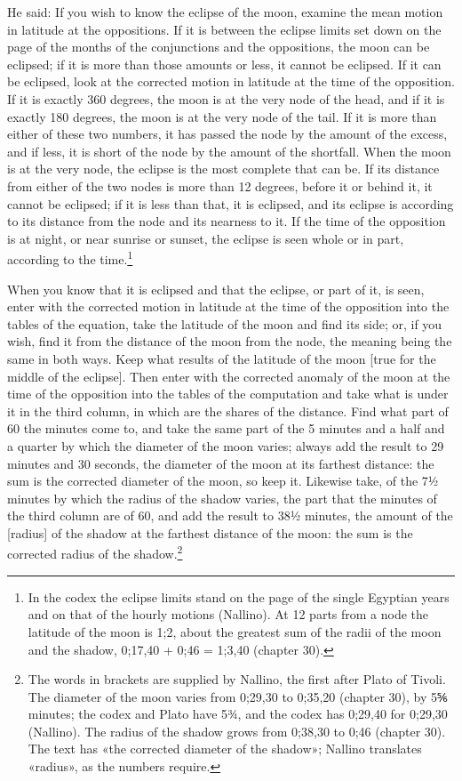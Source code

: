 \documentclass[11pt]{article}
\newcommand{\ArPage}[1]{\marginpar{\footnotesize\color{gray}Ar.\,p.\,#1}}
\begin{document}
\par He said: If you wish to know the eclipse of the moon, examine the mean motion in latitude at the oppositions. If it is between the eclipse limits set down on the page of the months of the conjunctions and the oppositions, the moon can be eclipsed; if it is more than those amounts or less, it cannot be eclipsed. If it can be eclipsed, look at the corrected motion in latitude at the time of the opposition. If it is exactly 360 degrees, the moon is at the very node of the head, and if it is exactly 180 degrees, the moon is at the very node of the tail. If it is more than either of these two numbers, it has passed the node by the amount of the excess, and if less, it is short of the node by the amount of the shortfall. When the moon is at the very node, the eclipse is the most complete that can be. If its distance from either of the two nodes is more than 12 degrees, before it or behind it, it cannot be eclipsed; if it is less than that, it is eclipsed, and its eclipse is according to its distance from the node and its nearness to it. If the time of the opposition is at night, or near sunrise or sunset, the eclipse is seen whole or in part, according to the time.\footnote{In the codex the eclipse limits stand on the page of the single Egyptian years and on that of the hourly motions (Nallino). At 12 parts from a node the latitude of the moon is 1;2, about the greatest sum of the radii of the moon and the shadow, 0;17,40 + 0;46 = 1;3,40 (chapter 30).}\par
\par \ArPage{147}When you know that it is eclipsed and that the eclipse, or part of it, is seen, enter with the corrected motion in latitude at the time of the opposition into the tables of the equation, take the latitude of the moon and find its side; or, if you wish, find it from the distance of the moon from the node, the meaning being the same in both ways. Keep what results of the latitude of the moon [true for the middle of the eclipse]. Then enter with the corrected anomaly of the moon at the time of the opposition into the tables of the computation and take what is under it in the third column, in which are the shares of the distance. Find what part of 60 the minutes come to, and take the same part of the 5 minutes and a half and a quarter by which the diameter of the moon varies; always add the result to 29 minutes and 30 seconds, the diameter of the moon at its farthest distance: the sum is the corrected diameter of the moon, so keep it. Likewise take, of the 7½ minutes by which the radius of the shadow varies, the part that the minutes of the third column are of 60, and add the result to 38½ minutes, the amount of the [radius] of the shadow at the farthest distance of the moon: the sum is the corrected radius of the shadow.\footnote{The words in brackets are supplied by Nallino, the first after Plato of Tivoli. The diameter of the moon varies from 0;29,30 to 0;35,20 (chapter 30), by 5⅚ minutes; the codex and Plato have 5¾, and the codex has 0;29,40 for 0;29,30 (Nallino). The radius of the shadow grows from 0;38,30 to 0;46 (chapter 30). The text has «the corrected diameter of the shadow»; Nallino translates «radius», as the numbers require.}\par
\end{document}
